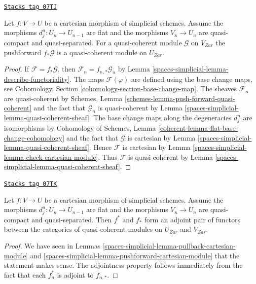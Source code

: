 \begin{lemma}
\label{spaces-simplicial-lemma-pushforward-cartesian-module}
\href{https://stacks.math.columbia.edu/tag/07TJ}{\texttt{Stacks tag 07TJ}}

Let $f : V \to U$ be a cartesian morphism of simplicial schemes.
Assume the morphisms $d^n_j : U_n \to U_{n - 1}$ are
flat and the morphisms $V_n \to U_n$ are quasi-compact and quasi-separated.
For a quasi-coherent module $\mathcal{G}$ on $V_{Zar}$
the pushforward $f_*\mathcal{G}$ is a quasi-coherent module on $U_{Zar}$.
\end{lemma}

\begin{proof}
If $\mathcal{F} = f_* \mathcal{G}$, then
$\mathcal{F}_n = f_{n , *}\mathcal{G}_n$ by
Lemma \ref{spaces-simplicial-lemma-describe-functoriality}.
The maps $\mathcal{F}(\varphi)$ are defined using the base change maps, see
Cohomology, Section \ref{cohomology-section-base-change-map}.
The sheaves $\mathcal{F}_n$ are quasi-coherent by
Schemes, Lemma \ref{schemes-lemma-push-forward-quasi-coherent}
and the fact that $\mathcal{G}_n$ is quasi-coherent
by Lemma \ref{spaces-simplicial-lemma-quasi-coherent-sheaf}.
The base change maps along the degeneracies
$d^n_j$ are isomorphisms by Cohomology of Schemes, Lemma
\ref{coherent-lemma-flat-base-change-cohomology}
and the fact that $\mathcal{G}$ is cartesian
by Lemma \ref{spaces-simplicial-lemma-quasi-coherent-sheaf}.
Hence $\mathcal{F}$ is cartesian by
Lemma \ref{spaces-simplicial-lemma-check-cartesian-module}.
Thus $\mathcal{F}$ is quasi-coherent by
Lemma \ref{spaces-simplicial-lemma-quasi-coherent-sheaf}.
\end{proof}

\begin{lemma}
\label{spaces-simplicial-lemma-adjoint-functors-cartesian-modules}
\href{https://stacks.math.columbia.edu/tag/07TK}{\texttt{Stacks tag 07TK}}

Let $f : V \to U$ be a cartesian morphism of
simplicial schemes. Assume the morphisms $d^n_j : U_n \to U_{n - 1}$ are
flat and the morphisms $V_n \to U_n$ are quasi-compact and quasi-separated.
Then $f^*$ and $f_*$ form an adjoint pair of functors
between the categories of quasi-coherent modules on $U_{Zar}$ and $V_{Zar}$.
\end{lemma}

\begin{proof}
We have seen in Lemmas \ref{spaces-simplicial-lemma-pullback-cartesian-module} and
\ref{spaces-simplicial-lemma-pushforward-cartesian-module}
that the statement makes sense. The adjointness property follows
immediately from the fact that each $f_n^*$ is adjoint to $f_{n, *}$.
\end{proof}

